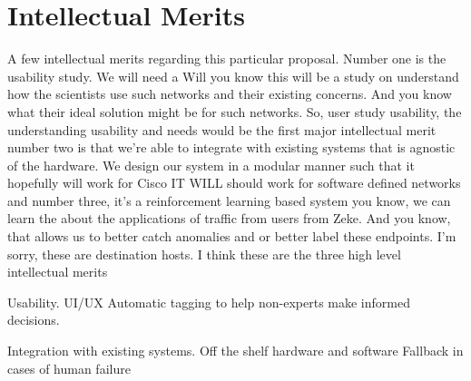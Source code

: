 \section{Intellectual Merits}


A few intellectual merits regarding this particular proposal. Number one is the usability study. We will need a Will you know this will be a study on understand how the scientists use such networks and their existing concerns. And you know what their ideal solution might be for such networks. So, user study usability, the understanding usability and needs would be the first major intellectual merit number two is that we're able to integrate with existing systems that is agnostic of the hardware. We design our system in a modular manner such that it hopefully will work for Cisco IT WILL should work for software defined networks and number three, it's a reinforcement learning based system you know, we can learn the about the applications of traffic from users from Zeke. And you know, that allows us to better catch anomalies and or better label these endpoints. I'm sorry, these are destination hosts. I think these are the three high level intellectual merits



Usability.
UI/UX
Automatic tagging to help non-experts make informed decisions.

Integration with existing systems.
Off the shelf hardware and software
Fallback in cases of human failure

